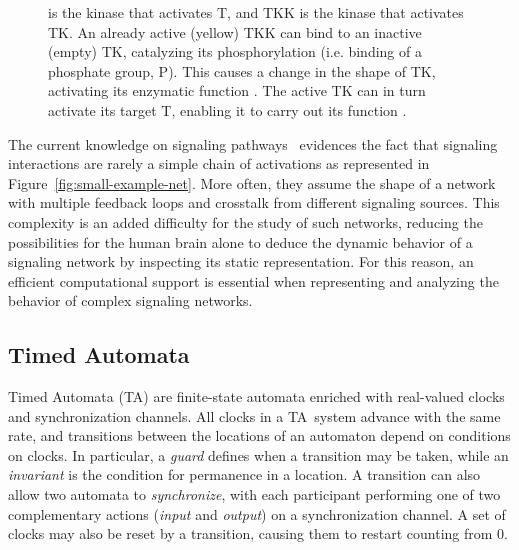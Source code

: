 \documentclass{llncs}
\newcommand{\ta}{Timed Automaton}
\newcommand{\tas}{Timed Automata}
\begin{document}
\begin{figure}[htbp]
{is the kinase that activates {\sf T}, and {\sf TKK} is the kinase that activates {\sf TK}.
{\bf\protect{}} An already active (yellow) {\sf TKK} can bind to
an inactive (empty) {\sf TK}, catalyzing its phosphorylation (i.e. binding of a phosphate group, {\sf P}).
This causes a change in the shape of {\sf TK}, activating its enzymatic function {\bf\protect{}}.
The active {\sf TK} can in turn activate its target {\sf T}, enabling it to carry out its function {\bf\protect{}}.
}\label{fig:small-example-biology}
\end{figure}


The current knowledge on signaling pathways~\cite{kegg,phosphosite} evidences the fact
that signaling interactions are rarely a simple chain of activations as represented in Figure~\ref{fig:small-example-net}.
More often, they assume the shape of a network with multiple feedback loops and crosstalk from different signaling sources.
This complexity is an added difficulty for the study of such networks, reducing the possibilities for the human brain alone
to deduce the dynamic behavior of a signaling network by inspecting its static representation.
For this reason, an efficient computational support is essential when representing and analyzing the behavior
of complex signaling networks.


\subsection{\tas}\label{sec:TA}
\renewcommand{\ta}{TA}
\renewcommand{\tas}{TA}
Timed Automata (\tas) are finite-state automata enriched with real-valued clocks
and synchronization channels. All clocks in a \tas\ system advance with the same rate,
and transitions between the locations of an automaton
depend on conditions on clocks. In particular, a \emph{guard} defines when a transition
may be taken, while an \emph{invariant} is the condition for permanence in a location.
A transition can also allow two automata to \emph{synchronize},
with each participant performing one of two complementary actions (\emph{input} and \emph{output})
on a synchronization channel. A set of clocks may also be reset by a transition, causing them to restart counting from 0.
\end{document}
